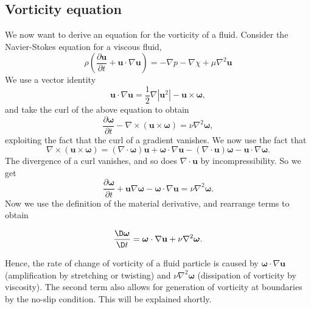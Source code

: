 \documentclass[a4paper]{article}
\begin{document}
\subsection{Vorticity equation}
We now want to derive an equation for the vorticity of a fluid. Consider the Navier-Stokes equation for a viscous fluid,
\[
  \rho\left(\frac{\partial \mathbf{u}}{\partial t} + \mathbf{u}\cdot \nabla \mathbf{u}\right) = -\nabla p - \nabla \chi + \mu \nabla^2 \mathbf{u}
\]
We use a vector identity
\[
  \mathbf{u}\cdot \nabla \mathbf{u} = \frac{1}{2}\nabla |\mathbf{u}^2| - \mathbf{u}\times \boldsymbol\omega,
\]
and take the curl of the above equation to obtain
\[
  \frac{\partial \boldsymbol\omega}{\partial t} - \nabla \times (\mathbf{u}\times \boldsymbol\omega) = \nu \nabla^2 \boldsymbol\omega,
\]
exploiting the fact that the curl of a gradient vanishes. We now use the fact that
\[
  \nabla \times (\mathbf{u}\times \boldsymbol\omega) = (\nabla \cdot \boldsymbol\omega) \mathbf{u} + \boldsymbol\omega \cdot \nabla \mathbf{u} - (\nabla \cdot \mathbf{u}) \boldsymbol\omega - \mathbf{u}\cdot \nabla \boldsymbol\omega.
\]
The divergence of a curl vanishes, and so does $\nabla \cdot \mathbf{u}$ by incompressibility. So we get
\[
  \frac{\partial \boldsymbol\omega}{\partial t} + \mathbf{u}\nabla \boldsymbol\omega - \boldsymbol\omega \cdot \nabla \mathbf{u} = \nu \nabla^2 \boldsymbol \omega.
\]
Now we use the definition of the material derivative, and rearrange terms to obtain
\begin{prop}
  \[
    \frac{\D \boldsymbol\omega}{\D t} = \boldsymbol\omega \cdot \nabla \mathbf{u} + \nu \nabla^2 \boldsymbol\omega.
  \]
\end{prop}
Hence, the rate of change of vorticity of a fluid particle is caused by $\boldsymbol\omega \cdot \nabla \mathbf{u}$ (amplification by stretching or twisting) and $\nu \nabla^2 \boldsymbol\omega$ (dissipation of vorticity by viscosity). The second term also allows for generation of vorticity at boundaries by the no-slip condition. This will be explained shortly.
\end{document}
